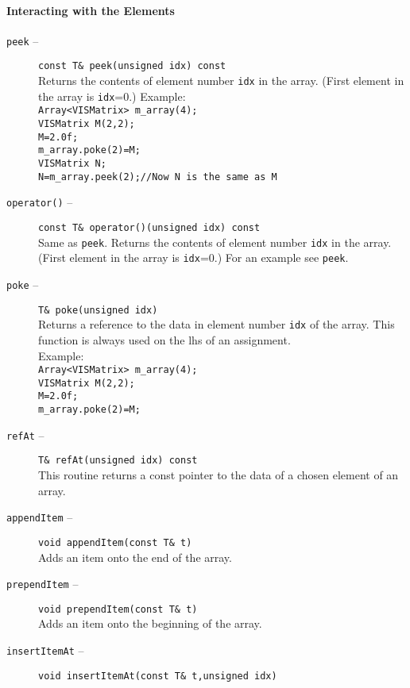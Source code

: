 \paragraph{Interacting with the Elements}
\begin{description}
\item[{\tt peek} --]
{\tt const T\& peek(unsigned idx) const}\\
Returns the contents of element number {\tt idx} in the array.
(First element in the array is {\tt idx}=0.)
Example:\\
{\tt Array<VISMatrix> m\_array(4);}\\
{\tt VISMatrix M(2,2);}\\
{\tt M=2.0f;}\\
{\tt m\_array.poke(2)=M;}\\
{\tt VISMatrix N;}\\
{\tt N=m\_array.peek(2);//Now N is the same as M}
\item[{\tt operator()} --]
{\tt const T\& operator()(unsigned idx) const}\\
Same as {\tt peek}.
Returns the contents of element number {\tt idx} in the array.
(First element in the array is {\tt idx}=0.)
For an example see {\tt peek}.
\item[{\tt poke} --]
{\tt T\& poke(unsigned idx)}\\
Returns a reference to the data in element number {\tt idx} of the array.
This function is always used on the lhs of an assignment.\\
Example:\\
{\tt Array<VISMatrix> m\_array(4);}\\
{\tt VISMatrix M(2,2);}\\
{\tt M=2.0f;}\\
{\tt m\_array.poke(2)=M;}
\item[{\tt refAt} --]
{\tt T\& refAt(unsigned idx) const}\\
This routine returns a const pointer to the data of a chosen element
of an array.
\item[{\tt appendItem} --]
{\tt void appendItem(const T\& t)}\\
Adds an item onto the end of the array.
\item[{\tt prependItem} --]
{\tt void prependItem(const T\& t)}\\
Adds an item onto the beginning of the array.
\item[{\tt insertItemAt} --]
{\tt void insertItemAt(const T\& t,unsigned idx)}\\

\end{description}
